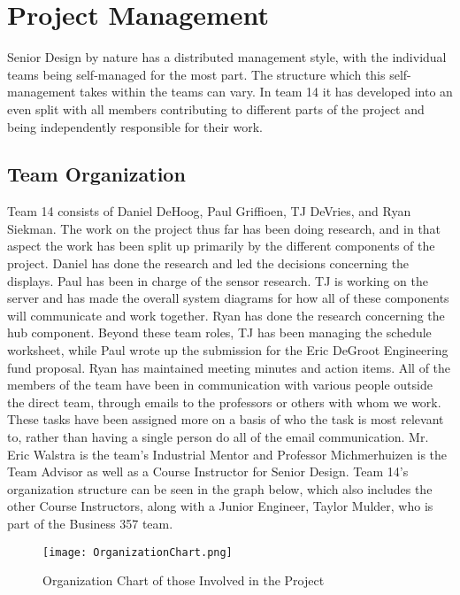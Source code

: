\documentclass[PPFS.tex]{template/subfiles}
\begin{document}
\section{Project Management}
Senior Design by nature has a distributed management style, with the individual teams being self-managed for the most part. The structure which this self-management takes within the teams can vary. In team 14 it has developed into an even split with all members contributing to different parts of the project and being independently responsible for their work.

    \subsection{Team Organization}
	Team 14 consists of Daniel DeHoog, Paul Griffioen, TJ DeVries, and Ryan Siekman. The work on the project thus far has been doing research, and in that aspect the work has been split up primarily by the different components of the project. Daniel has done the research and led the decisions concerning the displays. Paul has been in charge of the sensor research. TJ is working on the server and has made the overall system diagrams for how all of these components will communicate and work together. Ryan has done the research concerning the hub component. Beyond these team roles, TJ has been managing the schedule worksheet, while Paul wrote up the submission for the Eric DeGroot Engineering fund proposal. Ryan has maintained meeting minutes and action items. All of the members of the team have been in communication with various people outside the direct team, through emails to the professors or others with whom we work. These tasks have been assigned more on a basis of who the task is most relevant to, rather than having a single person do all of the email communication. Mr. Eric Walstra is the team's Industrial Mentor and Professor Michmerhuizen is the Team Advisor as well as a Course Instructor for Senior Design. Team 14's organization structure can be seen in the graph below, which also includes the other Course Instructors, along with a Junior Engineer, Taylor Mulder, who is part of the Business 357 team.
	
	\begin{figure}[h]
		\centering
		\texttt{[image: OrganizationChart.png]}
		\caption{Organization Chart of those Involved in the Project}
	\end{figure}
	
\end{document}
